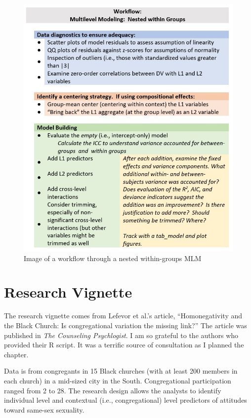 \documentclass[
  english,
]{book}
\begin{document}
\begin{figure}
\centering
\includegraphics{images/wiGroups/MLM_workflow_xs.jpg}
\caption{Image of a workflow through a nested within-groups MLM}
\end{figure}

\hypertarget{research-vignette}{%
\section{Research Vignette}\label{research-vignette}}

The research vignette comes from Lefevor et al.'s \citeyearpar{lefevor_homonegativity_2020} article, ``Homonegativity and the Black Church: Is congregational variation the missing link?'' The article was published in \emph{The Counseling Psychlogist}. I am so grateful to the authors who provided their R script. It was a terrific source of consultation as I planned the chapter.

Data is from congregants in 15 Black churches (with at least 200 members in each church) in a mid-sized city in the South. Congregational participation ranged from 2 to 28. The research design allows the analysts to identify individual level and contextual (i.e., congregational) level predictors of attitudes toward same-sex sexuality.
\end{document}
